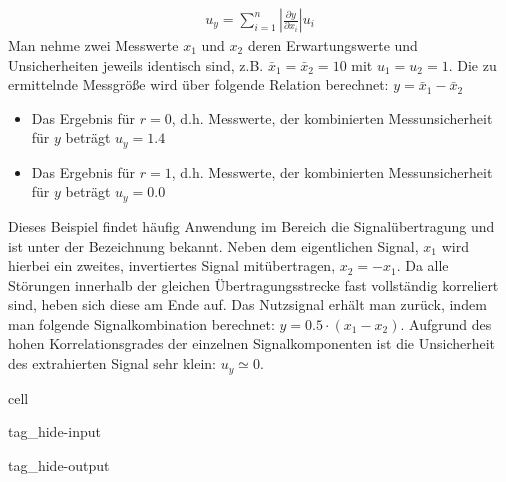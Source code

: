 \documentclass[letterpaper,10pt,english]{jupyterBook}
\begin{document}
\begin{equation*}
\begin{split}u_{y}= \displaystyle \sum_{i=1}^n
 \left| \frac{\partial y}{\partial x_i} \right| u_{i}\end{split}
\end{equation*}
\sphinxAtStartPar
{} Man nehme zwei Messwerte \(x_1\) und \(x_2\) deren Erwartungswerte und Unsicherheiten jeweils identisch sind, z.B. \(\bar x_1 = \bar x_2 = 10\) mit \(u_1 = u_2 = 1\). Die zu ermittelnde Messgröße wird über folgende Relation berechnet: \(y = \bar x_1 - \bar x_2\)
\begin{itemize}
\item {} 
\sphinxAtStartPar
Das Ergebnis für \(r = 0\), d.h.  Messwerte, der kombinierten Messunsicherheit für \(y\) beträgt \(u_y = 1.4\)

\item {} 
\sphinxAtStartPar
Das Ergebnis für \(r = 1\), d.h.  Messwerte, der kombinierten Messunsicherheit für \(y\) beträgt \(u_y = 0.0\)

\end{itemize}

\sphinxAtStartPar
Dieses Beispiel findet häufig Anwendung im Bereich die Signalübertragung und ist unter der Bezeichnung  bekannt. Neben dem eigentlichen Signal, \(x_1\) wird hierbei ein zweites, invertiertes Signal mitübertragen, \(x_2 = -x_1\). Da alle Störungen innerhalb der gleichen Übertragungsstrecke fast vollständig korreliert sind, heben sich diese am Ende auf. Das Nutzsignal erhält man zurück, indem man folgende Signalkombination berechnet: \(y = 0.5\cdot (x_1 - x_2)\). Aufgrund des hohen Korrelationsgrades der einzelnen Signalkomponenten ist die Unsicherheit des extrahierten Signal sehr klein: \(u_y \simeq 0\).

\sphinxstepscope

\begin{sphinxuseclass}{cell}
\begin{sphinxuseclass}{tag_hide-input}
\begin{sphinxuseclass}{tag_hide-output}
\end{sphinxuseclass}
\end{sphinxuseclass}
\end{sphinxuseclass}
\end{document}
